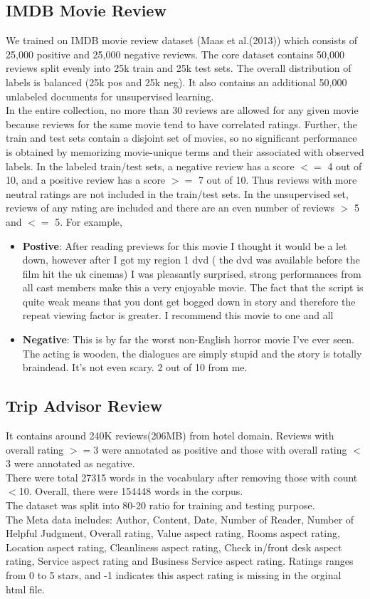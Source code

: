 \subsection{IMDB Movie Review}
We trained on IMDB movie review dataset (Maas et al.(2013)) which consists of 25,000 positive and 25,000 negative reviews. The core dataset contains 50,000 reviews split evenly into 25k train and 25k test sets. The overall distribution of labels is balanced (25k pos and 25k neg). It also contains an additional 50,000 unlabeled documents for unsupervised learning.\\
In the entire collection, no more than 30 reviews are allowed for any given movie because reviews for the same movie tend to have correlated ratings. Further, the train and test sets contain a disjoint set of movies, so no significant performance is obtained by memorizing movie-unique terms and their associated with observed labels.  In the labeled train/test sets, a negative review has a score $<=$ 4 out of 10, and a positive review has a score $>=$ 7 out of 10. Thus reviews with more neutral ratings are not included in the train/test sets. In the unsupervised set, reviews of any rating are included and there are an even number of reviews $>$ 5 and $<=$ 5. For example,
\begin{itemize}
\item \textbf{Postive}: After reading previews for this movie I thought it would be a let down, however after I got my region 1 dvd ( the dvd was available before the film hit the uk cinemas) I was pleasantly surprised, strong performances from all cast members make this a very enjoyable movie. The fact that the script is quite weak means that you dont get bogged down in story and therefore the repeat viewing factor is greater. I recommend this movie to one and all
\item \textbf{Negative}: This is by far the worst non-English horror movie I've ever seen. The acting is wooden, the dialogues are simply stupid and the story is totally braindead. It's not even scary. 2 out of 10 from me.
\end{itemize}

\subsection{Trip Advisor Review}
It contains around 240K reviews(206MB) from hotel domain. Reviews with overall rating $>=$3 were annotated as positive and those with overall rating $<$3 were annotated as negative.\\
There were total 27315 words in the vocabulary after removing those with count $<$10. Overall, there were 154448 words in the corpus.\\
The dataset was split into 80-20 ratio for training and testing purpose.\\
The Meta data includes: Author, Content, Date, Number of Reader, Number of Helpful Judgment, Overall rating, Value aspect rating, Rooms aspect rating, Location aspect rating, Cleanliness aspect rating, Check in/front desk aspect rating, Service aspect rating and Business Service aspect rating. Ratings ranges from 0 to 5 stars, and -1 indicates this aspect rating is missing in the orginal html file.

